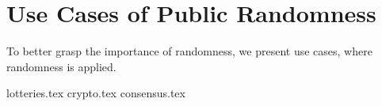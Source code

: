 \section{Use Cases of Public Randomness}\label{sec:use_cases_of_public_randomness}
To better grasp the importance of randomness, we present use cases, where randomness is applied.

{lotteries.tex}
{crypto.tex}
{consensus.tex}
